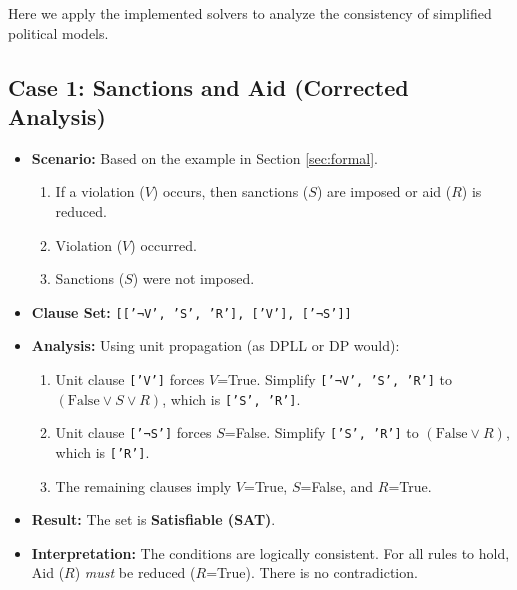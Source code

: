 \documentclass[11pt, a4paper]{article}
\begin{document}
Here we apply the implemented solvers to analyze the consistency of simplified political models.

\subsection*{Case 1: Sanctions and Aid (Corrected Analysis)}
\begin{itemize}
    \item \textbf{Scenario:} Based on the example in Section \ref{sec:formal}.
    \begin{enumerate}
        \item If a violation ($V$) occurs, then sanctions ($S$) are imposed or aid ($R$) is reduced.
        \item Violation ($V$) occurred.
        \item Sanctions ($S$) were not imposed.
    \end{enumerate}
    \item \textbf{Clause Set:} \texttt{[['¬V', 'S', 'R'], ['V'], ['¬S']]}
    \item \textbf{Analysis:} Using unit propagation (as DPLL or DP would):
    \begin{enumerate}
        \item Unit clause \texttt{['V']} forces $V$=True. Simplify \texttt{['¬V', 'S', 'R']} to $(\text{False} \vee S \vee R)$, which is \texttt{['S', 'R']}.
        \item Unit clause \texttt{['¬S']} forces $S$=False. Simplify \texttt{['S', 'R']} to $(\text{False} \vee R)$, which is \texttt{['R']}.
        \item The remaining clauses imply $V$=True, $S$=False, and $R$=True.
    \end{enumerate}
    \item \textbf{Result:} The set is \textbf{Satisfiable (SAT)}.
    \item \textbf{Interpretation:} The conditions are logically consistent. For all rules to hold, Aid ($R$) \textit{must} be reduced ($R$=True). There is no contradiction.
\end{itemize}
\end{document}
